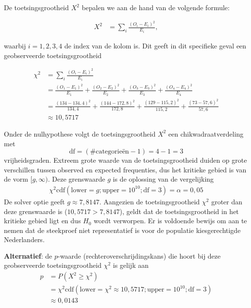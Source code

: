 {    De toetsingsgrootheid $X^2$ bepalen we aan de hand van de volgende formule:

    \begin{align*}
        X^2  &= \sum_{i} \frac{(O_{i} - E_{i})^2}{E_{i}},
    \end{align*}

    waarbij $i = 1,2,3,4$ de index van de kolom is.
    Dit geeft in dit specifieke geval een geobserveerde toetsingsgrootheid 
    
    \begin{align*}
        \chi^2  &= \sum_{i} \frac{(O_{i} - E_{i})^2}{E_{i}} \\
                &=\frac{(O_{1} - E_{1})^2}{E_{1}} + \frac{(O_{2} - E_{2})^2}{E_{2}} + \frac{(O_{3} - E_{3})^2}{E_{3}} + \frac{(O_{4} - E_{4})^2}{E_{4}} \\
                &= \frac{(134 - 134,4)^2}{134,4} + \frac{(144-172,8)^2}{172,8} + \frac{(129-115,2)^2}{115,2} + \frac{(73-57,6)^2}{57,6} \\
                &\approx 10,5717
    \end{align*}

    Onder de nulhypothese volgt de toetsingsgrootheid $X^2$ een chikwadraatverdeling met
    \[
        \text{df} = (\#\text{categorie\"en}-1) = 4 - 1 = 3
    \]
    vrijheidsgraden.
    Extreem grote waarde van de toetsingsgrootheid duiden op grote verschillen tussen observed en expected frequenties, dus het kritieke gebied is van de vorm $[g, \infty)$.
    Deze grenswaarde $g$ is de oplossing van de vergelijking
    \begin{align*}
        \chi^2\text{cdf}(\text{lower}=g; \text{upper}=10^{10}; \text{df}=3) = \alpha = 0,05
    \end{align*}
    De solver optie geeft $g \approx 7,8147$.
    Aangezien de toetsingsgrootheid $\chi^2$ groter dan deze grenswaarde is ($10,5717 > 7,8147$), geldt dat de toetsingsgrootheid in het kritieke gebied ligt en dus $H_0$ wordt verworpen.
    Er is voldoende bewijs om aan te nemen dat de steekproef niet representatief is voor de populatie kiesgerechtigde Nederlanders.
    
    \begin{center}
    \end{center}

    {\bfseries Alternatief}: de $p$-waarde (rechteroverschrijdingskans) die hoort bij deze geobserveerde toetsingsgrootheid $\chi^2$ is gelijk aan
    \begin{align*}
        p   &= P(X^2 \ge \chi^2) \\
            &= \chi^2\text{cdf}(\text{lower}=\chi^2\approx 10,5717; \text{upper}=10^{10}; \text{df}=3) \\
            &\approx 0,0143
    \end{align*}

}

